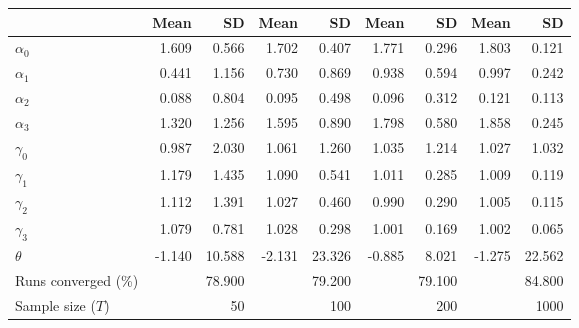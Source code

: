 
\begin{tabular}[t]{lrrrrrrrr}
\toprule
  & Mean & SD & Mean  & SD  & Mean   & SD   & Mean    & SD   \\
\midrule
$\alpha_{0}$ & 1.609 & 0.566 & 1.702 & 0.407 & 1.771 & 0.296 & 1.803 & 0.121\\
$\alpha_{1}$ & 0.441 & 1.156 & 0.730 & 0.869 & 0.938 & 0.594 & 0.997 & 0.242\\
$\alpha_{2}$ & 0.088 & 0.804 & 0.095 & 0.498 & 0.096 & 0.312 & 0.121 & 0.113\\
$\alpha_{3}$ & 1.320 & 1.256 & 1.595 & 0.890 & 1.798 & 0.580 & 1.858 & 0.245\\
$\gamma_{0}$ & 0.987 & 2.030 & 1.061 & 1.260 & 1.035 & 1.214 & 1.027 & 1.032\\
$\gamma_{1}$ & 1.179 & 1.435 & 1.090 & 0.541 & 1.011 & 0.285 & 1.009 & 0.119\\
$\gamma_{2}$ & 1.112 & 1.391 & 1.027 & 0.460 & 0.990 & 0.290 & 1.005 & 0.115\\
$\gamma_{3}$ & 1.079 & 0.781 & 1.028 & 0.298 & 1.001 & 0.169 & 1.002 & 0.065\\
$\theta$ & -1.140 & 10.588 & -2.131 & 23.326 & -0.885 & 8.021 & -1.275 & 22.562\\
Runs converged (\%) &  & 78.900 &  & 79.200 &  & 79.100 &  & 84.800\\
Sample size ($T$) &  & 50 &  & 100 &  & 200 &  & 1000\\
\bottomrule
\end{tabular}
